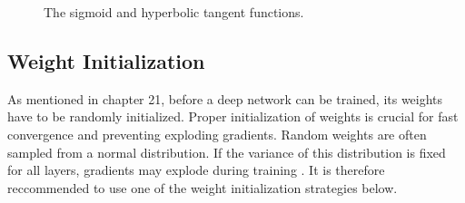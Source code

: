 \documentclass{article}
\begin{document}
\begin{figure}[h!]
    \centering
    \begin{subfigure}[b]{0.45\textwidth}
        \centering
        \label{fig:sigmoid}
    \end{subfigure}
    \hfill
    \begin{subfigure}[b]{0.45\textwidth}
        \centering
        \label{fig:tanh}
    \end{subfigure}
    \caption{The sigmoid and hyperbolic tangent functions.}
    \label{fig:activation_functions}
\end{figure}


\subsection{Weight Initialization} %

As mentioned in chapter 21, before a deep network can be trained, its weights have to be randomly initialized. Proper initialization of weights is crucial for fast convergence and preventing exploding gradients. Random weights are often sampled from a normal distribution. If the variance of this distribution is fixed for all layers, gradients may explode during training \cite{pml1book}. It is therefore reccommended to use one of the weight initialization strategies below.
\end{document}
